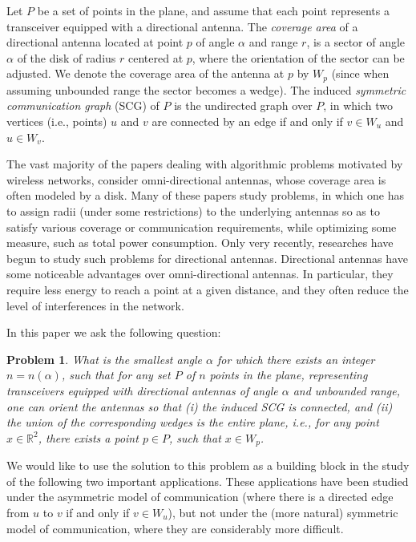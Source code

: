 \documentclass[11pt,letter]{article}
\newtheorem{problem}[theorem]{Problem}
\def\wedge#1{{W_{{#1}}}}
\begin{document}
Let $P$ be a set of points in the plane, and assume that each point represents a transceiver equipped with a directional antenna. The {\em coverage area} of a directional antenna located at point $p$ of angle $\alpha$ and range $r$, is a sector of angle $\alpha$ of the disk of radius $r$ centered at $p$, where the orientation of the sector can be adjusted. We denote the coverage area of the antenna at $p$ by $\wedge{p}$ (since when assuming unbounded range the sector becomes a wedge).
The induced {\em symmetric communication graph} (SCG) of $P$ is the undirected graph over $P$, in which two vertices (i.e., points) $u$ and $v$ are connected by an edge if and only if $v \in \wedge{u}$ and $u \in \wedge{v}$.


The vast majority of the papers dealing with algorithmic problems motivated by wireless networks, consider omni-directional antennas, whose coverage area is often modeled by a disk. Many of these papers study problems, in which one has to assign radii (under some restrictions) to the underlying antennas so as to satisfy various coverage or communication requirements, while optimizing some measure, such as total power consumption.
Only very recently, researches have begun to study such problems for directional antennas. Directional antennas
have some noticeable advantages over omni-directional antennas. In particular, they require less energy to reach a point at a given distance, and they often reduce the level of interferences in the network.

In this paper we ask the following question:
\begin{problem}\label{prob:smallest_angle}
What is the smallest angle $\alpha$ for which there exists an integer $n = n(\alpha)$, such that for any set $P$ of $n$ points in the plane,
representing transceivers equipped with directional antennas of angle $\alpha$ and unbounded range, one can orient the antennas so that (i) the induced SCG is connected, and (ii) the union of the corresponding wedges is the entire plane, i.e., for any point $x \in \mathbb{R}^2$, there exists a point $p \in P$, such that $x \in \wedge{p}$.
\end{problem}

We would like to use the solution to this problem as a building block in the study of the following two important applications.
These applications have been studied under the asymmetric model of communication (where there is a directed edge from $u$ to $v$ if and only if $v \in W_u$), but not under the (more natural) symmetric model of communication, where they are considerably more difficult.
\end{document}
